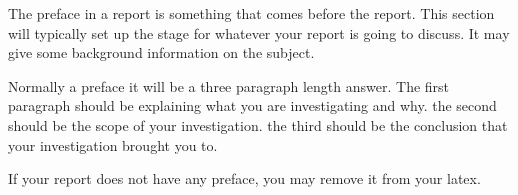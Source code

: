 The preface in a report is something that comes before the report. This section will typically set up the stage for whatever your report is going to discuss. It may give some background information on the subject.

Normally a preface it will be a three paragraph length answer. The first paragraph should be explaining what you are investigating and why. the second should be the scope of your investigation. the third should be the conclusion that your investigation brought you to.

If your report does not have any preface, you may remove it from your latex.